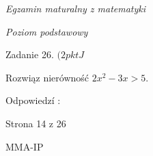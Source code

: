 \documentclass[a4paper,12pt]{article}
\begin{document}
{\it Egzamin maturalny z matematyki}

{\it Poziom podstawowy}

Zadanie 26. $(2pktJ$

Rozwiąz nierówność $2x^{2}-3x>5.$

Odpowiedzí :

Strona 14 z 26

MMA-IP
\end{document}

